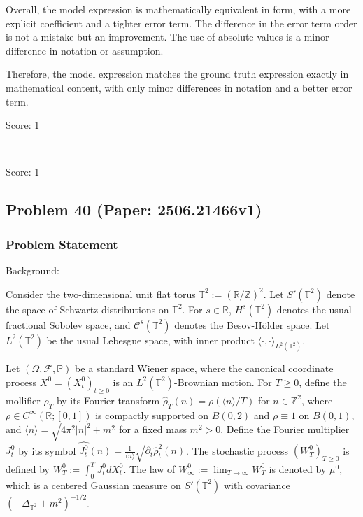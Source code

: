 \documentclass[10pt]{article}
\begin{document}
Overall, the model expression is mathematically equivalent in form, with a more explicit coefficient and a tighter error term. The difference in the error term order is not a mistake but an improvement. The use of absolute values is a minor difference in notation or assumption.

Therefore, the model expression matches the ground truth expression exactly in mathematical content, with only minor differences in notation and a better error term.

Score: 1

---

Score: 1

\newpage
\subsection*{Problem 40 (Paper: 2506.21466v1)}
\subsubsection*{Problem Statement}
Background:  

Consider the two-dimensional unit flat torus $\mathbb{T}^2 := (\mathbb{R}/\mathbb{Z})^2$. Let $S'(\mathbb{T}^2)$ denote the space of Schwartz distributions on $\mathbb{T}^2$. For $s \in \mathbb{R}$, $H^s(\mathbb{T}^2)$ denotes the usual fractional Sobolev space, and $\mathcal C^s(\mathbb{T}^2)$ denotes the Besov-H\"older space. Let $L^2(\mathbb{T}^2)$ be the usual Lebesgue space, with inner product $\langle \cdot, \cdot \rangle_{L^2(\mathbb{T}^2)}$.

Let $(\Omega, \mathcal F, \mathbb P)$ be a standard Wiener space, where the canonical coordinate process $X^0 = (X^0_t)_{t \geq 0}$ is an $L^2(\mathbb{T}^2)$-Brownian motion. For $T \geq 0$, define the mollifier $\rho_T$ by its Fourier transform $\hat \rho_T(n) = \rho(\langle n \rangle/T)$ for $n \in \mathbb Z^2$, where $\rho \in C^\infty(\mathbb R;[0,1])$ is compactly supported on $B(0,2)$ and $\rho \equiv 1$ on $B(0,1)$, and $\langle n \rangle = \sqrt{4\pi^2|n|^2+m^2}$ for a fixed mass $m^2>0$. Define the Fourier multiplier $J_t^0$ by its symbol $\widehat{J_t^0}(n) = \frac{1}{\langle n \rangle} \sqrt{\partial_t \hat\rho_t^2(n)}$. The stochastic process $(W^0_T)_{T \geq 0}$ is defined by $W^0_T := \int_0^T J^0_t dX^0_t$. The law of $W^0_\infty := \lim_{T \rightarrow \infty} W^0_T$ is denoted by $\mu^0$, which is a centered Gaussian measure on $S'(\mathbb{T}^2)$ with covariance $(-\Delta_{\mathbb{T}^2}+m^2)^{-1/2}$.
\end{document}
